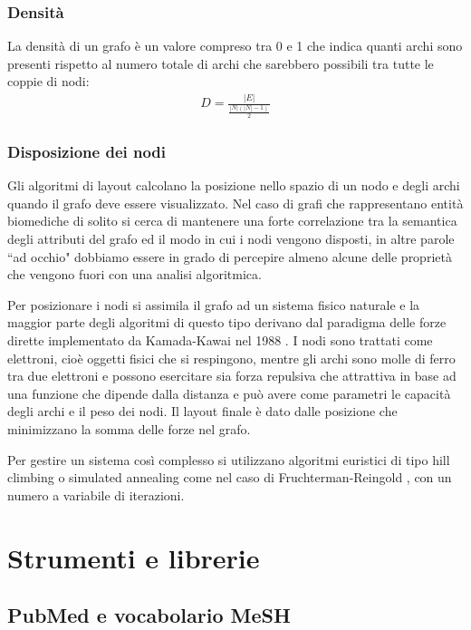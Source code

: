 \documentclass[12pt]{report}
\newcommand{\quotes}[1]{``#1"}
\begin{document}
\subsection{Densità}
La densità di un grafo è un valore compreso tra 0 e 1 che indica quanti archi sono presenti rispetto al numero totale di archi che sarebbero possibili tra tutte le coppie di nodi:
\begin{gather}
    D = \frac{|E|}{\frac{|N|(|N|-1)}{2}}
\end{gather}

\subsection{Disposizione dei nodi \label{layout}}

Gli algoritmi di layout calcolano la posizione nello spazio di un nodo e degli archi quando il grafo deve essere visualizzato. Nel caso di grafi che rappresentano entità biomediche di solito si cerca di mantenere una forte correlazione tra la semantica degli attributi del grafo ed il modo in cui i nodi vengono disposti, in altre parole \quotes{ad occhio} dobbiamo essere in grado di percepire almeno alcune delle proprietà che vengono fuori con una analisi algoritmica.

Per posizionare i nodi si assimila il grafo ad un sistema fisico naturale e la maggior parte degli algoritmi di questo tipo derivano dal paradigma delle forze dirette implementato da Kamada-Kawai nel 1988 \cite{kamada}. I nodi sono trattati come elettroni, cioè oggetti fisici che si respingono, mentre gli archi sono molle di ferro tra due elettroni e possono esercitare sia forza repulsiva che attrattiva in base ad una funzione che dipende dalla distanza e può avere come parametri le capacità degli archi e il peso dei nodi. Il layout finale è dato dalle posizione che minimizzano la somma delle forze nel grafo.

Per gestire un sistema così complesso si utilizzano algoritmi euristici di tipo hill climbing o simulated annealing come nel caso di Fruchterman-Reingold \cite{fruchterman}, con un numero a variabile di iterazioni.



\chapter{Strumenti e librerie}

\section{PubMed e vocabolario MeSH}
\end{document}
